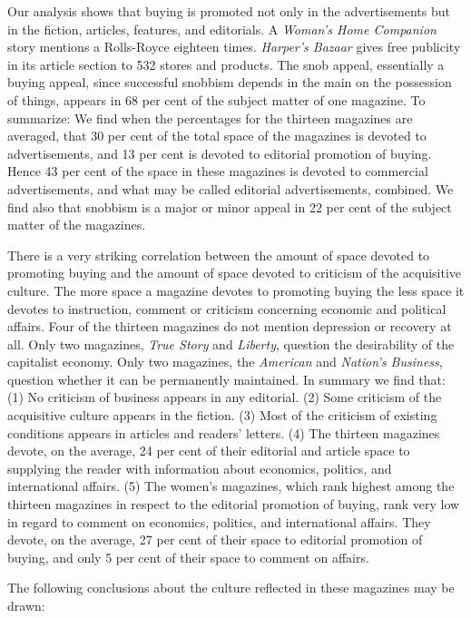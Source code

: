 \documentclass[twoside,nohyper,openany,nobib]{tufte-book}
\begin{document}
Our analysis shows that buying is promoted not only in the
advertisements but in the fiction, articles, features, and editorials. A
\emph{Woman's Home Companion} story mentions a Rolls-Royce eighteen
times. \emph{Harper's Bazaar} gives free publicity in its article
section to 532 stores and products. The snob appeal, essentially a
buying appeal, since successful snobbism depends in the main on the
possession of things, appears in 68 per cent of the subject matter of
one magazine. To summarize: We find when the percentages for the
thirteen magazines are averaged, that 30 per cent of the total space of
the magazines is devoted to advertisements, and 13 per cent is devoted
to editorial promotion of buying. Hence 43 per cent of the space in
these magazines is devoted to commercial advertisements, and what may be
called editorial advertisements, combined. We find also that snobbism is
a major or minor appeal in 22 per cent of the subject matter of the
magazines.

There is a very striking correlation between the amount of space devoted
to promoting buying and the amount of space devoted to criticism of the
acquisitive culture. The more space a magazine devotes to promoting
buying the less space it devotes to instruction, comment or criticism
concerning economic and political affairs. Four of the thirteen
magazines do not mention depression or recovery at all. Only two
magazines, \emph{True Story} and \emph{Liberty}, question the
desirability of the capitalist economy. Only two magazines, the
\emph{American} and \emph{Nation's Business}, question whether it can be
permanently maintained. In summary we find that: (1) No criticism of
business appears in any editorial. (2) Some criticism of the acquisitive
culture appears in the fiction. (3) Most of the criticism of existing
conditions appears in articles and readers' letters. (4) The thirteen
magazines devote, on the average, 24 per cent of their editorial and
article space to supplying the reader with information about economics,
politics, and international affairs. (5) The women's magazines, which
rank highest among the thirteen magazines in respect to the editorial
promotion of buying, rank very low in regard to comment on economics,
politics, and international affairs. They devote, on the average, 27 per
cent of their space to editorial promotion of buying, and only 5 per
cent of their space to comment on affairs.

The following conclusions about the culture reflected in these magazines
may be drawn:
\end{document}
